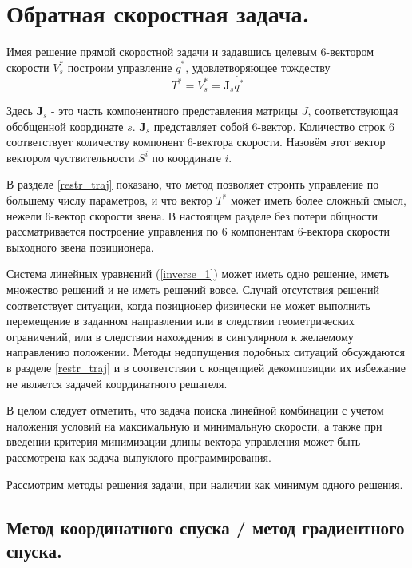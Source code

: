 \section{Обратная скоростная задача.}\label{invspd_sect}

Имея решение прямой скоростной задачи и задавшись целевым 6-вектором скорости $V_s^*$ построим управление $\dot{q}^{*}$, удовлетворяющее тождеству
\begin{equation}\label{inverse_1}
T^* = V_s^* = \textbf{J}_s\dot{q^*}  
\end{equation}

Здесь $\textbf{J}_s$ - это часть компонентного представления матрицы \textbf{$J$}, соответствующая обобщенной координате $s$. $\textbf{J}_s$ представляет собой 6-вектор. Количество строк $6$ соответствует количеству компонент 6-вектора скорости. Назовём этот вектор вектором чуствительности $S^i$ по координате $i$.

\colorbox{shadecolor}
{\parbox{0.9\textwidth}{В разделе \ref{restr_traj} показано, что метод позволяет строить управление по большему числу параметров, и что вектор $T^*$ может иметь более сложный смысл, нежели 6-вектор скорости звена. В настоящем разделе без потери общности рассматривается построение управления по 6 компонентам 6-вектора скорости выходного звена позиционера.}}

Система линейных уравнений (\ref{inverse_1}) может иметь одно решение, иметь множество решений и не иметь решений вовсе. Случай отсутствия решений соответствует ситуации, когда позиционер физически не может выполнить перемещение в заданном направлении или в следствии геометрических ограничений, или в следствии нахождения в сингулярном к желаемому направлению положении. Методы недопущения подобных ситуаций обсуждаются в разделе \ref{restr_traj} и в соответствии с концепцией декомпозиции их избежание не является задачей координатного решателя. 

В целом следует отметить, что задача поиска линейной комбинации с учетом наложения условий на максимальную и минимальную скорости, а также при введении критерия минимизации длины вектора управления может быть рассмотрена как задача выпуклого программирования.

Рассмотрим методы решения задачи, при наличии как минимум одного решения.

\subsection{Метод координатного спуска / метод градиентного спуска.}

